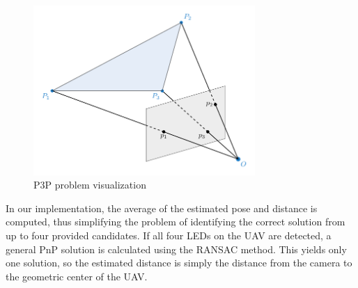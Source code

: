 \begin{figure}[H]
	\centering
	\includegraphics[width=0.75\textwidth]{./fig/tikz/p3p.pdf}
	\caption{P3P problem visualization}
	\label{fig:p3p}
\end{figure}
In our implementation, the average of the estimated pose and distance is computed, thus simplifying the problem of identifying the correct solution from
up to four provided candidates.
If all four \ac{LED}s on the \ac{UAV} are detected, a general \ac{PnP} solution is calculated using the \ac{RANSAC} method.
This yields only one solution, so the estimated distance is simply the distance from the camera to the geometric center of the \ac{UAV}.